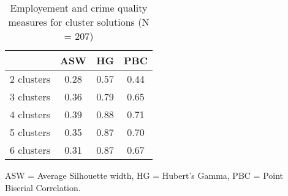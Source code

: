 \begin{table}[htp]
\footnotesize
\setlength{\tabcolsep}{35pt}
\renewcommand{\arraystretch}{1.3}
\begin{threeparttable}
\centering
\caption{Employement and crime quality measures for cluster solutions (N = 207)} 
\label{tab:quality_clusters_job_crime}
\begin{tabular}{lccc}
  \hline
 & ASW & HG & PBC \\ 
  \hline
2 clusters & 0.28 & 0.57 & 0.44 \\ 
  3 clusters & 0.36 & 0.79 & 0.65 \\ 
  4 clusters & 0.39 & 0.88 & 0.71 \\ 
  5 clusters & 0.35 & 0.87 & 0.70 \\ 
  6 clusters & 0.31 & 0.87 & 0.67 \\ 
   \hline
\end{tabular}
\begin{tablenotes}
\scriptsize
\item ASW = Average Silhouette width, HG = Hubert's Gamma, PBC = Point Biserial Correlation.
\end{tablenotes}
\end{threeparttable}
\end{table}
